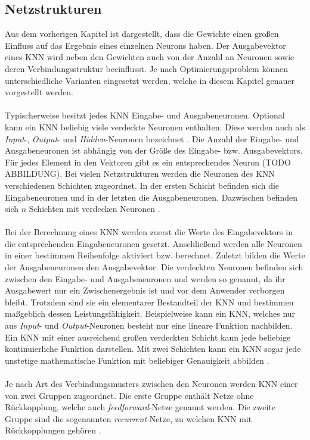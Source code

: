 \subsection{Netzstrukturen}
\label{subsec:network_structures}
Aus dem vorherigen Kapitel ist dargestellt, dass die Gewichte einen großen Einfluss auf das Ergebnis eines einzelnen Neurons haben. Der Ausgabevektor eines \ac{KNN} wird neben den Gewichten auch von der Anzahl an Neuronen sowie deren Verbindungsstruktur beeinflusst. Je nach Optimierungsproblem können unterschiedliche Varianten eingesetzt werden, welche in diesem Kapitel genauer vorgestellt werden. 
\\\\ %
Typischerweise besitzt jedes \ac{KNN} Eingabe- und Ausgabeneuronen. Optional kann ein \ac{KNN} beliebig viele verdeckte Neuronen enthalten. Diese werden auch als \emph{Input}-, \emph{Output}- und \emph{Hidden}-Neuronen bezeichnet \cite{zell2003simulation}. Die Anzahl der Eingabe- und Ausgabeneuronen ist abhängig von der Größe des Eingabe- bzw. Ausgabevektors. Für jedes Element in den Vektoren gibt es ein entsprechendes Neuron (TODO ABBILDUNG).
Bei vielen Netzstrukturen werden die Neuronen des \ac{KNN} verschiedenen Schichten zugeordnet. In der ersten Schicht befinden sich die Eingabeneuronen und in der letzten die Ausgabeneuronen. Dazwischen befinden sich $n$ Schichten mit verdecken Neuronen \cite{zell2003simulation}.
\\\\
Bei der Berechnung eines \ac{KNN} werden zuerst die Werte des Eingabevektors in die entsprechenden Eingabeneuronen gesetzt. Anschließend werden alle Neuronen in einer bestimmen Reihenfolge aktiviert bzw. berechnet. Zuletzt bilden die Werte der Ausgabeneuronen den Ausgabevektor. Die verdeckten Neuronen befinden sich zwischen den Eingabe- und Ausgabeneuronen und werden so genannt, da ihr Ausgabewert nur ein Zwischenergebnis ist und vor dem Anwender verborgen bleibt. Trotzdem sind sie ein elementarer Bestandteil der \ac{KNN} und bestimmen maßgeblich dessen Leistungsfähigkeit. Beispielweise kann ein \ac{KNN}, welches nur aus \emph{Input}- und \emph{Output}-Neuronen besteht nur eine lineare Funktion nachbilden. Ein \ac{KNN} mit einer ausreichend großen verdeckten Schicht kann jede beliebige kontinuierliche Funktion darstellen. Mit zwei Schichten kann ein \ac{KNN} sogar jede unstetige mathematische Funktion mit beliebiger Genauigkeit abbilden \cite{russell2013kunstliche}. 
\\\\
Je nach Art des Verbindungsmusters zwischen den Neuronen werden \ac{KNN} einer von zwei Gruppen zugeordnet. Die erste Gruppe enthält Netze ohne Rückkopplung, welche auch \emph{feedforward}-Netze genannt werden. Die zweite Gruppe sind die sogenannten \emph{recurrent}-Netze, zu welchen \ac{KNN} mit Rückkopplungen gehören \cite{zell2003simulation}.

